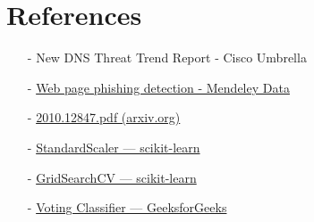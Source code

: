 \section{References}
\begin{itemize}
    \item[-] New DNS Threat Trend Report - Cisco Umbrella
    \item[-] \href{https://data.mendeley.com/datasets/c2gw7fy2j4/3}{Web page phishing detection - Mendeley Data}
    \item[-] \href{https://arxiv.org/pdf/2010.12847}{2010.12847.pdf (arxiv.org)}
    \item[-] \href{https://scikit-learn.org/stable/modules/generated/sklearn.preprocessing.StandardScaler.html}{StandardScaler — scikit-learn}
    \item[-] \href{https://scikit-learn.org/stable/modules/generated/sklearn.model_selection.GridSearchCV.html}{GridSearchCV — scikit-learn}
    \item[-] \href{https://www.geeksforgeeks.org/voting-classifier/}{Voting Classifier — GeeksforGeeks}
\end{itemize}
